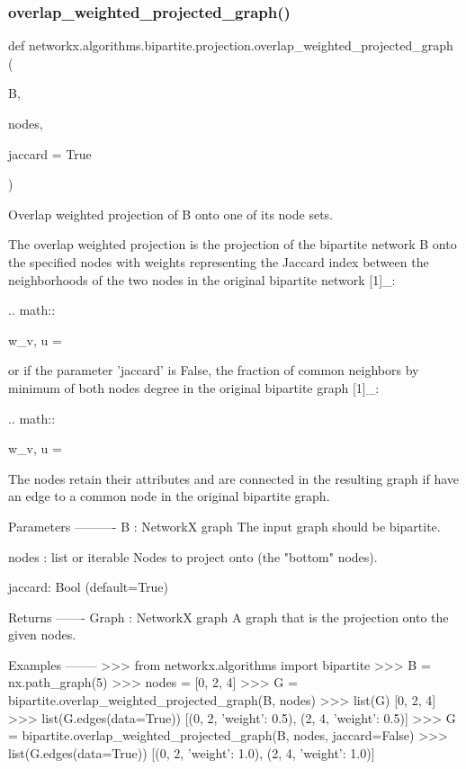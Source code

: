 \subsubsection{\texorpdfstring{overlap\+\_\+weighted\+\_\+projected\+\_\+graph()}{overlap\_weighted\_projected\_graph()}}
{\footnotesize\ttfamily def networkx.\+algorithms.\+bipartite.\+projection.\+overlap\+\_\+weighted\+\_\+projected\+\_\+graph (\begin{DoxyParamCaption}\item[{}]{B,  }\item[{}]{nodes,  }\item[{}]{jaccard = {\ttfamily True} }\end{DoxyParamCaption})}

\begin{DoxyVerb}Overlap weighted projection of B onto one of its node sets.

The overlap weighted projection is the projection of the bipartite
network B onto the specified nodes with weights representing
the Jaccard index between the neighborhoods of the two nodes in the
original bipartite network [1]_:

.. math::

    w_{v, u} = 

or if the parameter 'jaccard' is False, the fraction of common
neighbors by minimum of both nodes degree in the original
bipartite graph [1]_:

.. math::

    w_{v, u} = 

The nodes retain their attributes and are connected in the resulting
graph if have an edge to a common node in the original bipartite graph.

Parameters
----------
B : NetworkX graph
    The input graph should be bipartite.

nodes : list or iterable
    Nodes to project onto (the "bottom" nodes).

jaccard: Bool (default=True)

Returns
-------
Graph : NetworkX graph
   A graph that is the projection onto the given nodes.

Examples
--------
>>> from networkx.algorithms import bipartite
>>> B = nx.path_graph(5)
>>> nodes = [0, 2, 4]
>>> G = bipartite.overlap_weighted_projected_graph(B, nodes)
>>> list(G)
[0, 2, 4]
>>> list(G.edges(data=True))
[(0, 2, {'weight': 0.5}), (2, 4, {'weight': 0.5})]
>>> G = bipartite.overlap_weighted_projected_graph(B, nodes, jaccard=False)
>>> list(G.edges(data=True))
[(0, 2, {'weight': 1.0}), (2, 4, {'weight': 1.0})]


\end{DoxyVerb}

